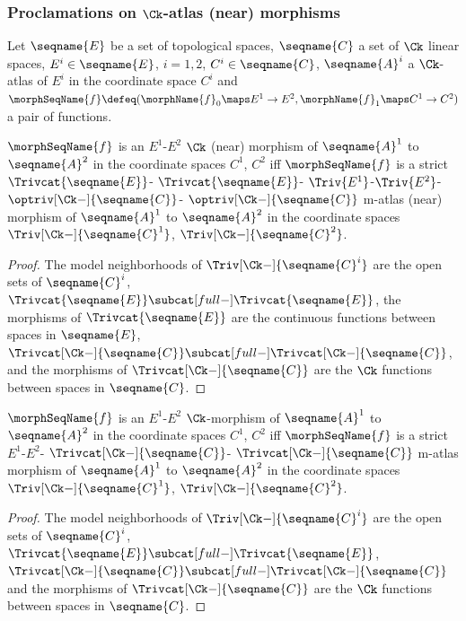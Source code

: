 \documentclass{article}
\begin{document}
\subsubsection{Proclamations on \ensuremath{\Ck}-atlas (near) morphisms}
\begin{lemma}
\label{lem:Ck-ATLmorph}
Let $\seqname{E}$ be a set of topological spaces, $\seqname{C}$ a set of
$\Ck$ linear spaces, $E^i \in \seqname{E}$, $i=1,2$,
$C^i \in \seqname{C}$, $\seqname{A}^i$ a $\Ck$-atlas of $E^i$ in the
coordinate space $C^i$ and
$
  \morphSeqName{f} \defeq
  (
    \morphName{f}_0 \maps E^1 \to E^2,
    \morphName{f}_1 \maps C^1 \to C^2
  )
$
a pair of functions.

$\morphSeqName{f}$ is an $E^1$-$E^2$ $\Ck$ (near) morphism of
$\seqname{A}^1$ to $\seqname{A}^2$ in the coordinate spaces $C^1$, $C^2$
iff $\morphSeqName{f}$ is a strict
$\Trivcat{\seqname{E}}$-%
$\Trivcat{\seqname{E}}$-%
$\Triv{E^1}$-$\Triv{E^2}$-%
$\optriv[\Ck-]{\seqname{C}}$-%
$\optriv[\Ck-]{\seqname{C}}$
m-atlas (near) morphism of $\seqname{A}^1$ to $\seqname{A}^2$ in the
coordinate spaces $\Triv[\Ck-]{\seqname{C}^1}$,
$\Triv[\Ck-]{\seqname{C}^2}$.

\begin{proof}
The model neighborhoods of $\Triv[\Ck-]{\seqname{C}^i}$ are the open sets
of $\seqname{C}^i$,
$\Trivcat{\seqname{E}} \subcat[full-] \Trivcat{\seqname{E}}$,
the morphisms of $\Trivcat{\seqname{E}}$ are the continuous
functions between spaces in $\seqname{E}$,
$\Trivcat[\Ck-]{\seqname{C}} \subcat[full-] \Trivcat[\Ck-]{\seqname{C}}$,
and the morphisms of $\Trivcat[\Ck-]{\seqname{C}}$ are the $\Ck$
functions between spaces in $\seqname{C}$.
\end{proof}

$\morphSeqName{f}$ is an $E^1$-$E^2$ $\Ck$-morphism of $\seqname{A}^1$ to
$\seqname{A}^2$ in the coordinate spaces $C^1$, $C^2$ iff
$\morphSeqName{f}$ is a strict
$E^1$-$E^2$-%
$\Trivcat[\Ck-]{\seqname{C}}$-%
$\Trivcat[\Ck-]{\seqname{C}}$
m-atlas morphism of $\seqname{A}^1$ to $\seqname{A}^2$ in the coordinate
spaces $\Triv[\Ck-]{\seqname{C}^1}$, $\Triv[\Ck-]{\seqname{C}^2}$.

\begin{proof}
The model neighborhoods of $\Triv[\Ck-]{\seqname{C}^i}$ are the open sets
of $\seqname{C}^i$,
$\Trivcat{\seqname{E}} \subcat[full-] \Trivcat{\seqname{E}}$,
$\Trivcat[\Ck-]{\seqname{C}} \subcat[full-] \Trivcat[\Ck-]{\seqname{C}}$
and the morphisms of $\Trivcat[\Ck-]{\seqname{C}}$ are the $\Ck$
functions between spaces in $\seqname{C}$.
\end{proof}
\end{lemma}
\end{document}
